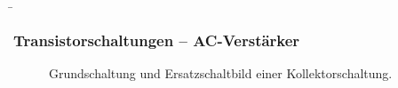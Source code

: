 \begin{frame}
    \b{ \frametitle{Transistorschaltungen -- AC-Verstärker}

      \begin{figure}[H]
        
            \begin{minipage}[c]{0.48\textwidth}
                \raggedright
                \scalebox{1.5}{}
            \end{minipage}
            \begin{minipage}[c]{0.48\textwidth}
                \raggedleft
                \scalebox{0.9}{}
            \end{minipage}
            \caption{Grundschaltung und Ersatzschaltbild einer Kollektorschaltung.} 
        \end{figure}    
        
    \begin{itemize}
    \end{itemize}
    }
\end{frame} 

